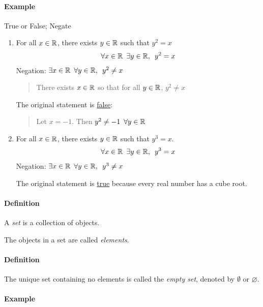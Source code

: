 \documentclass[../main.tex]{subfiles}
\begin{document}
\paragraph{Example} True or False; Negate

\begin{enumerate}
    \item For all $x \in \mathbb{R}$, there exists $y \in \mathbb{R}$ such that $y^2 = x$
    \begin{align*}
        \forall x \in \mathbb{R} \enspace \exists y \in \mathbb{R}, \enspace y^2 = x
    \end{align*}
    Negation: $\exists x \in \mathbb{R} \enspace \forall y \in \mathbb{R}, \enspace y^2 \neq x$
    \begin{quote}
        There exists $x \in \mathbb{R}$ so that for all $y \in \mathbb{R}$, $y^2 \neq x$
    \end{quote}
    The original statement is \underline{false}:
    \begin{quote}
        Let $x = -1$. Then $y^2 \neq -1 \enspace \forall y \in \mathbb{R}$
    \end{quote}
    
    \item For all $x \in \mathbb{R}$, there exists $y \in \mathbb{R}$ such that $y^3 = x$.
    \begin{align*}
        \forall x \in \mathbb{R} \enspace \exists y \in \mathbb{R}, \enspace y^3 = x
    \end{align*}
    Negation: $\exists x \in \mathbb{R} \enspace \forall y \in \mathbb{R}, \enspace y^3 \neq x$

    The original statement is \underline{true} because every real number has a cube root.
\end{enumerate}

\paragraph{Definition} A \emph{set} is a collection of objects.

The objects in a set are called \emph{elements}.

\paragraph{Definition} The unique set containing no elements is called the \emph{empty set}, 
denoted by $\emptyset$ or $\varnothing$.

\paragraph{Example}
\end{document}
